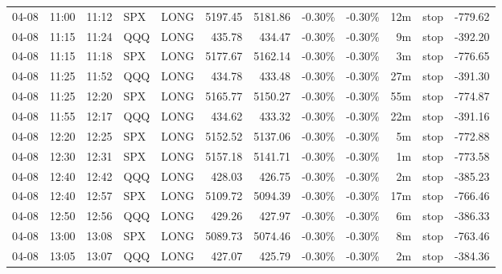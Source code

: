 \documentclass[11pt,a4paper,twoside]{article}
\begin{document}
\begin{center}
\begin{longtable}{>{\color{txtmain}}l l l l l r r r r r >{\color{txtmain}}l r}
04-08 & 11:00 & 11:12 & SPX & LONG & 5197.45 & 5181.86 & \textcolor{lossred}{-0.30\%} & \textcolor{lossred}{-0.30\%} & 12m & stop & \textcolor{lossred}{-779.62} \\
04-08 & 11:15 & 11:24 & QQQ & LONG & 435.78 & 434.47 & \textcolor{lossred}{-0.30\%} & \textcolor{lossred}{-0.30\%} & 9m & stop & \textcolor{lossred}{-392.20} \\
04-08 & 11:15 & 11:18 & SPX & LONG & 5177.67 & 5162.14 & \textcolor{lossred}{-0.30\%} & \textcolor{lossred}{-0.30\%} & 3m & stop & \textcolor{lossred}{-776.65} \\
04-08 & 11:25 & 11:52 & QQQ & LONG & 434.78 & 433.48 & \textcolor{lossred}{-0.30\%} & \textcolor{lossred}{-0.30\%} & 27m & stop & \textcolor{lossred}{-391.30} \\
04-08 & 11:25 & 12:20 & SPX & LONG & 5165.77 & 5150.27 & \textcolor{lossred}{-0.30\%} & \textcolor{lossred}{-0.30\%} & 55m & stop & \textcolor{lossred}{-774.87} \\
04-08 & 11:55 & 12:17 & QQQ & LONG & 434.62 & 433.32 & \textcolor{lossred}{-0.30\%} & \textcolor{lossred}{-0.30\%} & 22m & stop & \textcolor{lossred}{-391.16} \\
04-08 & 12:20 & 12:25 & SPX & LONG & 5152.52 & 5137.06 & \textcolor{lossred}{-0.30\%} & \textcolor{lossred}{-0.30\%} & 5m & stop & \textcolor{lossred}{-772.88} \\
04-08 & 12:30 & 12:31 & SPX & LONG & 5157.18 & 5141.71 & \textcolor{lossred}{-0.30\%} & \textcolor{lossred}{-0.30\%} & 1m & stop & \textcolor{lossred}{-773.58} \\
04-08 & 12:40 & 12:42 & QQQ & LONG & 428.03 & 426.75 & \textcolor{lossred}{-0.30\%} & \textcolor{lossred}{-0.30\%} & 2m & stop & \textcolor{lossred}{-385.23} \\
04-08 & 12:40 & 12:57 & SPX & LONG & 5109.72 & 5094.39 & \textcolor{lossred}{-0.30\%} & \textcolor{lossred}{-0.30\%} & 17m & stop & \textcolor{lossred}{-766.46} \\
04-08 & 12:50 & 12:56 & QQQ & LONG & 429.26 & 427.97 & \textcolor{lossred}{-0.30\%} & \textcolor{lossred}{-0.30\%} & 6m & stop & \textcolor{lossred}{-386.33} \\
04-08 & 13:00 & 13:08 & SPX & LONG & 5089.73 & 5074.46 & \textcolor{lossred}{-0.30\%} & \textcolor{lossred}{-0.30\%} & 8m & stop & \textcolor{lossred}{-763.46} \\
04-08 & 13:05 & 13:07 & QQQ & LONG & 427.07 & 425.79 & \textcolor{lossred}{-0.30\%} & \textcolor{lossred}{-0.30\%} & 2m & stop & \textcolor{lossred}{-384.36} \\

\end{longtable}
\end{center}
\end{document}
